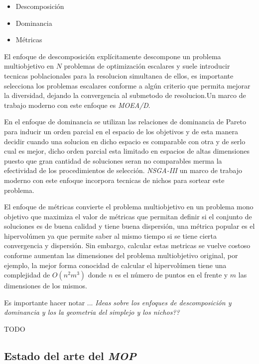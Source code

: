 \documentclass[letterpaper,10pt]{article}
\begin{document}
\begin{itemize}
 \item Descomposición
 \item Dominancia
 \item Métricas
\end{itemize}

El enfoque de descomposición explícitamente descompone un problema multiobjetivo en $N$ problemas de optimización escalares y suele introducir tecnicas poblacionales para la resolucion simultanea de ellos, es importante selecciona los problemas escalares conforme a algún criterio que permita mejorar la diversidad, dejando la convergencia al submetodo de resolucion.Un marco de trabajo moderno con este enfoque es \emph{MOEA/D}.
\newline

En el enfoque de dominancia se utilizan las relaciones de dominancia de Pareto para inducir un orden parcial en el espacio de los objetivos y de esta manera decidir cuando una solucion en dicho espacio es comparable con otra y de serlo cual es mejor, dicho orden parcial esta limitado en espacios de altas dimensiones puesto que gran cantidad de soluciones seran no comparables merma la efectividad de los procedimientos de selección. \emph{NSGA-III} un marco de trabajo moderno con este enfoque incorpora tecnicas de nichos para sortear este problema.
\newline

El enfoque de métricas convierte el problema multiobjetivo en un problema mono objetivo que maximiza el valor de métricas que permitan definir si el conjunto de soluciones es de buena calidad y  tiene buena dispersión, una métrica popular es el hipervolúmen ya que permite saber al mismo tiempo si se tiene cierta convergencia y dispersión. Sin embargo, calcular estas metricas se vuelve costoso conforme aumentan las dimensiones del problema multiobjetivo original, por ejemplo, la mejor forma conocidad de calcular el hipervolúmen tiene una complejidad de $O(n^2m^3)$ donde $n$ es el número de puntos en el frente y $m$ las dimensiones de los mismos. 
\newline

Es importante hacer notar ... \emph{Ideas sobre los enfoques de descomposición y dominancia y los la geometria del  simplejo y los nichos??} 
\newline

{\huge TODO}

\subsection{Estado del arte del \emph{MOP}}
\end{document}
